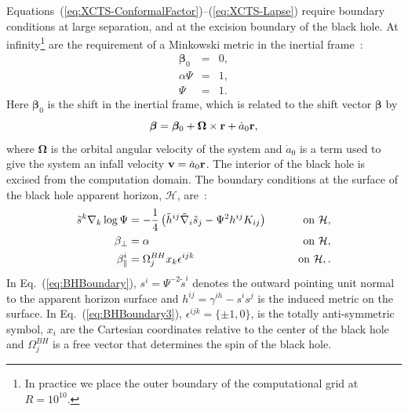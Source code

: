 Equations~(\ref{eq:XCTS-ConformalFactor})--(\ref{eq:XCTS-Lapse})
require boundary conditions at large separation, and at the excision
boundary of the black hole. At infinity\footnote{In practice we place
  the outer boundary of the computational grid at $R=10^{10}$.} are
the requirement of a Minkowski metric in the inertial frame~\citep{FoucartEtAl:2008}:
\begin{eqnarray}
  \boldsymbol{\beta}_0&=&0,\label{eq:QQQQ}\\
  \alpha\Psi &=& 1,\\
  \Psi &=&1.
\end{eqnarray}
Here $\boldsymbol{\beta}_0$ is the shift in the inertial frame, which is related to the shift vector $\boldsymbol{\beta}$ by
\begin{equation}
\label{eq:ShiftExpansion}
\boldsymbol{\beta} = \boldsymbol{\beta}_0 + \boldsymbol{\Omega}\times{\bf r}+\dot{a}_0{\bf r},
\end{equation}
where $\boldsymbol{\Omega}$ is the orbital angular velocity of the system and $\dot{a}_0$ is a term used to give the system an infall velocity ${\bf v}=\dot{a}_0{\bf r}$.
The interior of the black hole is excised from the computation
domain. The boundary conditions at the surface of the black hole
apparent horizon, $\mathcal{H}$, are~\citep{Cook2004}:
\begin{eqnarray}
  \tilde{s}^k\nabla_k\log\Psi
  &=-\frac{1}{4}\left(\tilde{h}^{ij}\tilde{\nabla}_i\tilde{s}_j-\Psi^2h^{ij}K_{ij}\right)
\qquad &{\rm on} ~\mathcal{H}, \label{eq:BHBoundary}\\
\beta_{\perp}&=\alpha &{\rm on} ~\mathcal{H}, \label{eq:BHBoundary2} \\
\beta_{\parallel}^i&=\Omega_{j}^{BH}x_k\epsilon^{ijk}
&{\rm on}
~\mathcal{H}, \label{eq:BHBoundary3}.
\end{eqnarray}
In Eq.~(\ref{eq:BHBoundary}), $s^i=\Psi^{-2}\tilde{s}^i$ denotes the
outward pointing unit normal to the apparent horizon surface and
$h^{ij}=\gamma^{ih}-s^is^j$ is the induced metric on the surface. In
Eq.~(\ref{eq:BHBoundary3}), $\epsilon^{ijk}=\{\pm1,0\}$, is the totally
anti-symmetric symbol, $x_i$ are the Cartesian coordinates relative to
the center of the black hole and $\Omega_j^{BH}$ is a free vector that
determines the spin of the black hole.




